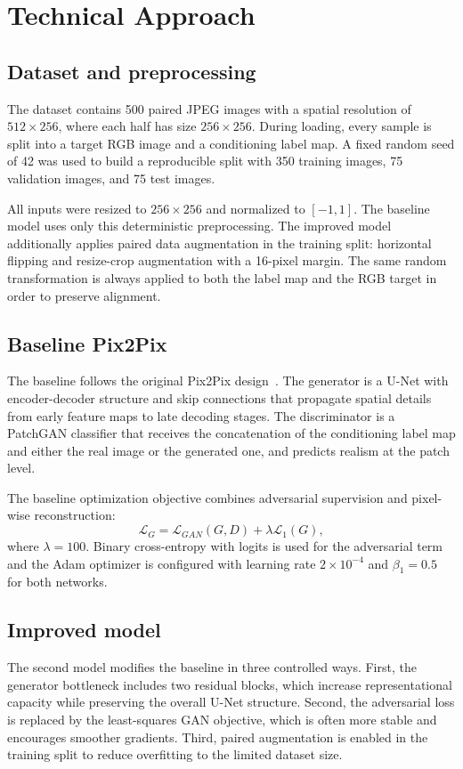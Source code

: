 \documentclass[conference]{IEEEtran}
\begin{document}
\section{Technical Approach}
\subsection{Dataset and preprocessing}
The dataset contains 500 paired JPEG images with a spatial resolution of $512 \times 256$, where each half has size $256 \times 256$. During loading, every sample is split into a target RGB image and a conditioning label map. A fixed random seed of 42 was used to build a reproducible split with 350 training images, 75 validation images, and 75 test images.

All inputs were resized to $256 \times 256$ and normalized to $[-1,1]$. The baseline model uses only this deterministic preprocessing. The improved model additionally applies paired data augmentation in the training split: horizontal flipping and resize-crop augmentation with a 16-pixel margin. The same random transformation is always applied to both the label map and the RGB target in order to preserve alignment.

\subsection{Baseline Pix2Pix}
The baseline follows the original Pix2Pix design~\cite{isola2017pix2pix}. The generator is a U-Net with encoder-decoder structure and skip connections that propagate spatial details from early feature maps to late decoding stages. The discriminator is a PatchGAN classifier that receives the concatenation of the conditioning label map and either the real image or the generated one, and predicts realism at the patch level.

The baseline optimization objective combines adversarial supervision and pixel-wise reconstruction:
\begin{equation}
\mathcal{L}_{G}=\mathcal{L}_{GAN}(G,D)+\lambda\mathcal{L}_{1}(G),
\end{equation}
where $\lambda=100$. Binary cross-entropy with logits is used for the adversarial term and the Adam optimizer is configured with learning rate $2\times10^{-4}$ and $\beta_1=0.5$ for both networks.

\subsection{Improved model}
The second model modifies the baseline in three controlled ways. First, the generator bottleneck includes two residual blocks, which increase representational capacity while preserving the overall U-Net structure. Second, the adversarial loss is replaced by the least-squares GAN objective, which is often more stable and encourages smoother gradients. Third, paired augmentation is enabled in the training split to reduce overfitting to the limited dataset size.
\end{document}
